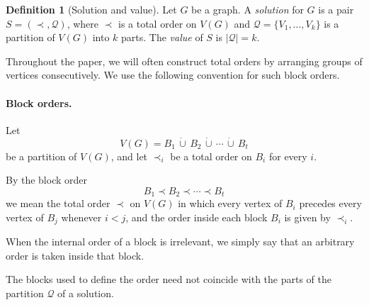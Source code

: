 \documentclass[12pt]{article}
\theoremstyle{plain}
\theoremstyle{definition}
\newtheorem{definition}[theorem]{Definition}
\theoremstyle{remark}
\theoremstyle{definition}
\begin{document}
\label{subsec:solutions-avoidance}
\begin{definition}[Solution and value]
Let \(G\) be a graph. A \emph{solution} for $G$ is a pair \(S=(\prec,\mathcal Q)\), where \(\prec\) is a total order on \(V(G)\)
and \(\mathcal Q=\{V_1,\dots,V_k\}\) is a partition of \(V(G)\) into \(k\) parts.
The \emph{value} of \(S\) is \(|\mathcal Q|=k\).
\end{definition}


Throughout the paper, we will often construct total orders by arranging
groups of vertices consecutively. We use the following convention for such
block orders.

\paragraph{Block orders.}
Let
\[
V(G)=B_1\,\dot\cup\,B_2\,\dot\cup\,\cdots\,\dot\cup\,B_t
\]
be a partition of \(V(G)\), and let \(\prec_i\) be a total order on
\(B_i\) for every \(i\).

By the block order
\[
B_1\prec B_2\prec\cdots\prec B_t
\]
we mean the total order \(\prec\) on \(V(G)\) in which every vertex of
\(B_i\) precedes every vertex of \(B_j\) whenever \(i<j\), and the order
inside each block \(B_i\) is given by \(\prec_i\).

When the internal order of a block is irrelevant, we simply say that an
arbitrary order is taken inside that block.


The blocks used to define the order need not coincide with the parts of the
partition \(\mathcal Q\) of a solution.
\end{document}
